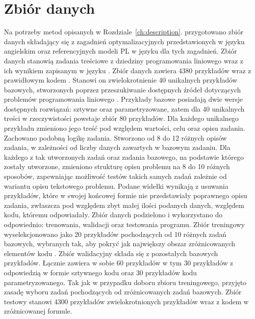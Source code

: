 
\chapter{Zbiór danych}\label{ch:dataset}

Na potrzeby metod opisanych w Rozdziale~\ref{ch:description}. przygotowano zbiór danych składający się z zagadnień optymalizacyjnych przedstawionych w języku angielskim oraz referencyjnych modeli PL w języku  dla tych zagadnień. Zbiór danych stanowią zadania treściowe z dziedziny programowania liniowego wraz z ich wynikiem zapisanym w języku .
Zbiór danych zawiera 4380 przykładów wraz z prawidłowym kodem . Stanowi on zwielokrotnienie 40 unikalnych przykładów bazowych, stworzonych poprzez przeszukiwanie dostępnych źródeł dotyczących problemów programowania liniowego \cite{brilliant_linear,byjus_linear,cimt,arsdcollege2020,libretexts_linear,superprof_linear,toppr_graphical}. Przykłady bazowe posiadają dwie wersje dostępnych rozwiązań: sztywne oraz parametryzowane, zatem dla 40 unikalnych treści w rzeczywistości powstaje zbiór 80 przykładów. Dla każdego unikalnego przykładu zmieniono jego treść pod względem wartości, celu oraz opisu zadania. Zachowano podobną logikę zadania. Stworzono od 8 do 12 różnych opisów zadania, w zależności od liczby danych zawartych w bazowym zadaniu. Dla każdego z tak utworzonych zadań oraz zadania bazowego, na podstawie którego zostały utworzone, zmieniono strukturę opisu problemu na 8 do 10 różnych sposobów, zapewniając możliwość testów takich samych zadań zależnie od wariantu opisu tekstowego problemu. Podane widełki wynikają z usuwania przykładów, które w swojej końcowej formie nie przedstawiały poprawnego opisu zadania, zwłaszcza pod względem zbyt małej ilości podanych danych, względem kodu, któremu odpowiadały.
Zbiór danych podzielono i wykorzystano do odpowiednio: trenowania, walidacji oraz testowania programu. Zbiór treningowy wyselekcjonowano jako 20 przykładów pochodzących od 10 różnych zadań bazowych, wybranych tak, aby pokryć jak największy obszar zróżnicowanych elementów kodu . Zbiór walidacyjny składa się z pozostałych bazowych przykładów. Łącznie zawiera w sobie 60 przykładów w tym 30 przykładów z odpowiedzią w formie sztywnego kodu oraz 30 przykładów kodu parametryzowanego. Tak jak w przypadku doboru zbioru treningowego, przyjęto zasadę wyboru zadań pochodzących od zróżnicowanych zadań bazowych. Zbiór testowy stanowi 4300 przykładów zwielokrotnionych przykładów wraz z kodem  w zróżnicowanej formule.  %

